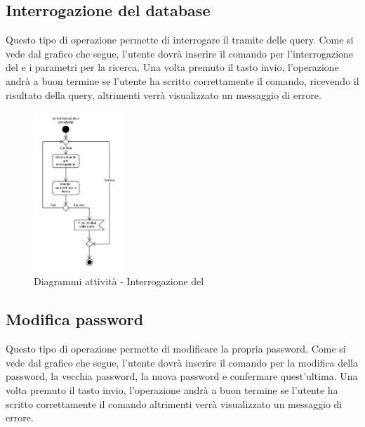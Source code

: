 \documentclass{scalatekids-article}
\begin{document}
\subsection{Interrogazione del database}

Questo tipo di operazione permette di interrogare il  tramite delle
query. Come si vede dal grafico che segue, l'utente dovrà inserire il comando
per l'interrogazione del  e i parametri per la ricerca. Una volta
premuto il tasto invio, l'operazione andrà a buon termine se l'utente ha
scritto correttamente il comando, ricevendo il risultato della query,
altrimenti verrà visualizzato un messaggio di errore.

\begin{figure}[H]
  \begin{center}
    \includegraphics[width=0.3\textwidth, keepaspectratio]{img/diagrammiAttivita/query.jpeg}
    \caption{Diagrammi attività - Interrogazione del }
  \end{center}
\end{figure}

\subsection{Modifica password}

Questo tipo di operazione permette di modificare la propria password. Come si
vede dal grafico che segue, l'utente dovrà inserire il comando per la modifica
della password, la vecchia password, la nuova password e confermare
quest'ultima. Una volta premuto il tasto invio, l'operazione andrà a buon
termine se l'utente ha scritto correttamente il comando altrimenti verrà
visualizzato un messaggio di errore.
\end{document}
